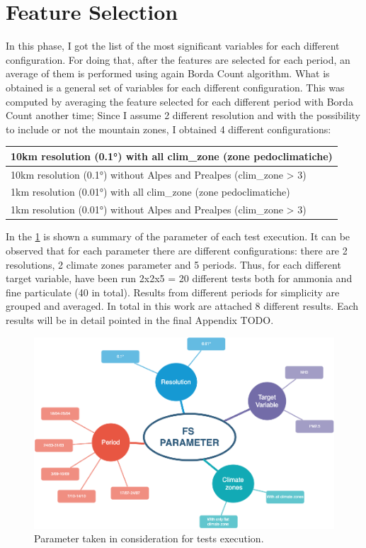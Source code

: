 \section{Feature Selection}
In this phase, I got the list of the most significant variables for each different configuration.
For doing that, after the features are selected for each period, an average of them is performed using again Borda Count algorithm. What is obtained is a general set of variables for each different configuration.
This was computed by averaging the feature selected for each different period with Borda Count another time;
Since I assume 2 different resolution and with the possibility to include or not the mountain zones, I obtained 4 different configurations: 
\begin{table}[H]
    \centering
    \begin{tabular}{|l|}
    \hline
        10km resolution (0.1°) with all clim\_zone (zone pedoclimatiche)  \\ \hline
        10km resolution (0.1°) without Alpes and Prealpes (clim\_zone > 3) \\ \hline
        1km resolution (0.01°) with all clim\_zone (zone pedoclimatiche)   \\ \hline
        1km resolution (0.01°) without Alpes and Prealpes (clim\_zone > 3)  \\ \hline
 
    \end{tabular}
\end{table}
In the \ref{fig:test_params} is shown a summary of the parameter of each test execution.
It can be observed that for each parameter there are different configurations: there are 2 resolutions, 2 climate zones parameter and 5 periods. Thus, for each different target variable, have been run 2x2x5 = 20 different tests both for ammonia and fine particulate (40 in total). 
Results from different periods for simplicity are grouped and averaged. In total in this work are attached 8 different results. Each results will be in detail pointed in the final Appendix TODO.
\begin{figure}[H]
    \centering
    \includegraphics[width=.9\textwidth]{images/test_param.png}
    \caption{Parameter taken in consideration for tests execution.}
    \label{fig:test_params}
\end{figure}


